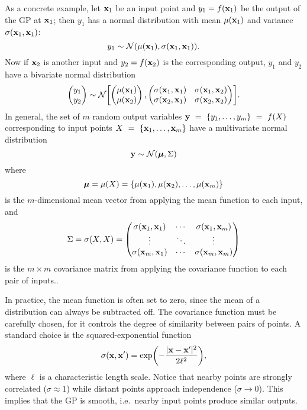 \documentclass[aps,prc,reprint,superscriptaddress,amsmath]{revtex4-1}
\begin{document}
As a concrete example, let $\mathbf x_1$ be an input point and $y_1 = f(\mathbf x_1)$ be the output of the GP at $\mathbf x_1$; then $y_1$ has a normal distribution with mean $\mu(\mathbf x_1)$ and variance $\sigma(\mathbf x_1, \mathbf x_1)$:
\begin{equation}
  y_1 \sim \mathcal N(\mu(\mathbf x_1), \sigma(\mathbf x_1, \mathbf x_1)).
\end{equation}
Now if $\mathbf x_2$ is another input and $y_2 = f(\mathbf x_2)$ is the corresponding output, $y_1$ and $y_2$ have a bivariate normal distribution
\begin{equation}
  \begin{pmatrix}
    y_1 \\ y_2
  \end{pmatrix}
  \sim \mathcal N\biggl[
    \begin{pmatrix}
      \mu(\mathbf x_1) \\ \mu(\mathbf x_2)
    \end{pmatrix},
    \begin{pmatrix}
      \sigma(\mathbf x_1, \mathbf x_1) & \sigma(\mathbf x_1, \mathbf x_2) \\
      \sigma(\mathbf x_2, \mathbf x_1) & \sigma(\mathbf x_2, \mathbf x_2) \\
    \end{pmatrix}
  \biggr].
\end{equation}
In general, the set of $m$ random output variables $\mathbf y~=~\{y_1, \ldots, y_m\}~=~f(X)$ corresponding to input points $X~=~\{\mathbf x_1, \ldots, \mathbf x_m\}$ have a multivariate normal distribution
\begin{equation}
  \mathbf y \sim \mathcal N(\boldsymbol\mu, \Sigma)
\end{equation}
where
\begin{equation}
  \boldsymbol\mu = \mu(X) = \{\mu(\mathbf x_1), \mu(\mathbf x_2), \ldots, \mu(\mathbf x_m)\} \\
\end{equation}
is the $m$-dimensional mean vector from applying the mean function to each input, and
\begin{equation}
  \Sigma = \sigma(X, X) =
  \begin{pmatrix}
    \sigma(\mathbf x_1, \mathbf x_1) & \cdots & \sigma(\mathbf x_1, \mathbf x_m) \\
    \vdots & \ddots & \vdots \\
    \sigma(\mathbf x_m, \mathbf x_1) & \cdots & \sigma(\mathbf x_m, \mathbf x_m) \\
  \end{pmatrix}
\end{equation}
is the $m \times m$ covariance matrix from applying the covariance function to each pair of inputs..

In practice, the mean function is often set to zero, since the mean of a distribution can always be subtracted off.
The covariance function must be carefully chosen, for it controls the degree of similarity between pairs of points.
A standard choice is the squared-exponential function
\begin{equation}
  \sigma(\mathbf x, \mathbf x') = \exp\biggl( -\frac{|\mathbf x - \mathbf x'|^2}{2\ell^2} \biggr),
\end{equation}
where $\ell$ is a characteristic length scale.
Notice that nearby points are strongly correlated ($\sigma \approx 1$) while distant points approach independence ($\sigma \rightarrow 0$).
This implies that the GP is smooth, i.e.\ nearby input points produce similar outputs.
\end{document}
